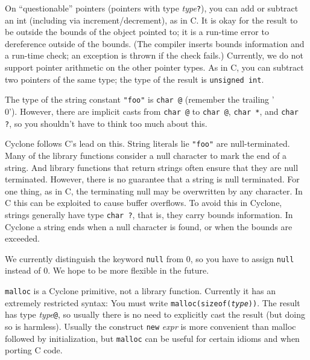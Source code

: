 
On ``questionable'' pointers (pointers with type
\textit{type}\texttt{?}), you can add or subtract an int (including
via increment/decrement), as in C\@.  It is okay for the result to be
outside the bounds of the object pointed to; it is a run-time error to
dereference outside of the bounds.  (The compiler inserts bounds
information and a run-time check; an exception is thrown if the check
fails.)  Currently, we do not support pointer arithmetic on the other
pointer types.  As in C, you can subtract two pointers of the same
type; the type of the result is \texttt{unsigned int}.


The type of the string constant \texttt{"foo"} is \texttt{char @\rb} (remember the trailing '\\0').  However, there are implicit
casts from \texttt{char @\rb} to \texttt{char @\rb},
\texttt{char *\rb}, and \texttt{char ?}, so you shouldn't have to
think too much about this.


Cyclone follows C's lead on this.  String literals lie \texttt{"foo"}
are null-terminated.  Many of the library functions consider a null
character to mark the end of a string.  And library functions that
return strings often ensure that they are null terminated.  However,
there is no guarantee that a string is null terminated.  For one
thing, as in C, the terminating null may be overwritten by any
character.  In C this can be exploited to cause buffer overflows.  To
avoid this in Cyclone, strings generally have type \texttt{char ?},
that is, they carry bounds information.  In Cyclone a string ends when
a null character is found, or when the bounds are exceeded.


We currently distinguish the keyword \texttt{null} from 0, so you have
to assign \texttt{null} instead of 0.  We hope to be more flexible in
the future.


\texttt{malloc} is a Cyclone primitive, not a library function.
Currently it has an extremely restricted syntax: You must write
\texttt{malloc(sizeof(\textit{type}))}.  The result has type
\textit{type}\texttt{@}, so usually there is no need to explicitly
cast the result (but doing so is harmless).  Usually the construct
\texttt{new} \textit{expr} is more convenient than malloc followed by
initialization, but \texttt{malloc} can be useful for certain idioms
and when porting C code.

